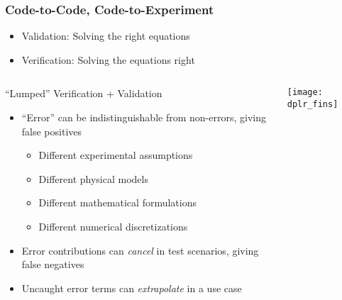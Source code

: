 \begin{frame}
\frametitle{Code-to-Code, Code-to-Experiment}
\begin{itemize}
  \item Validation: Solving the right equations
  \item Verification: Solving the equations right
\end{itemize}
\begin{columns}
\begin{column}{.7\textwidth}
\begin{block}{``Lumped'' Verification + Validation}
\begin{itemize}
\item ``Error'' can be indistinguishable from non-errors, giving false
  positives
\begin{itemize}
\item Different experimental assumptions
\item Different physical models
\item Different mathematical formulations
\item Different numerical discretizations
\end{itemize}
\item Error contributions can \emph{cancel} in test scenarios, giving
  false negatives
\item Uncaught error terms can \emph{extrapolate} in a use case
\end{itemize}
\end{block}
\end{column}
\begin{column}{.3\textwidth}
\begin{center}
\texttt{[image: dplr\_fins]}
\end{center}
\end{column}
\end{columns}

\end{frame}

